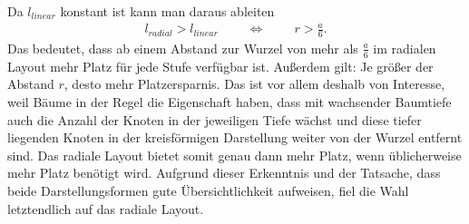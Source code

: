 Da $l_{linear}$ konstant ist kann man daraus ableiten
\begin{align*}
l_{radial} > l_{linear} \mspace{40mu} \Leftrightarrow  \mspace{40mu} r > \frac{a}{6}.
\end{align*}
Das bedeutet, dass ab einem Abstand zur Wurzel von mehr als $\frac{a}{6}$ im radialen Layout mehr Platz für jede Stufe verfügbar ist. Außerdem gilt: Je größer der Abstand $r$, desto mehr Platzersparnis. Das ist vor allem deshalb von Interesse, weil Bäume in der Regel die Eigenschaft haben, dass mit wachsender Baumtiefe auch die Anzahl der Knoten in der jeweiligen Tiefe wächst und diese tiefer liegenden Knoten in der kreisförmigen Darstellung weiter von der Wurzel entfernt sind. Das radiale Layout bietet somit genau dann mehr Platz, wenn üblicherweise mehr Platz benötigt wird.
Aufgrund dieser Erkenntnis und der Tatsache, dass beide Darstellungsformen gute Übersichtlichkeit aufweisen, fiel die Wahl letztendlich auf das radiale Layout.

